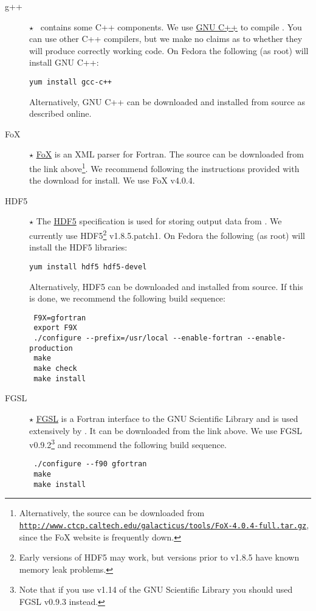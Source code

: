 \begin{description}
 \item [g++] $\star$ \glc\ contains some C++ components. We use \href{http://gcc.gnu.org/projects/cxx0x.html}{GNU C++} to compile \glc. You can use other C++ compilers, but we make no claims as to whether they will produce correctly working code. On Fedora the following (as root) will install GNU C++:
\begin{verbatim}
yum install gcc-c++
\end{verbatim}
Alternatively, GNU C++ can be downloaded and installed from source as described online.

 \item [FoX] $\star$ \href{http://uszla.me.uk/space/software/FoX/}{FoX} is an XML parser for Fortran. The source can be downloaded from the link above\footnote{Alternatively, the source can be downloaded from \href{http://www.ctcp.caltech.edu/galacticus/tools/FoX-4.0.4-full.tar.gz}{\tt http://www.ctcp.caltech.edu/galacticus/tools/FoX-4.0.4-full.tar.gz}, since the FoX website is frequently down.}. We recommend following the instructions provided with the download for install. We use FoX v4.0.4.

 \item [HDF5] $\star$ The \href{http://hdf4.org/HDF5/}{HDF5} specification is used for storing output data from \glc. We currently use HDF5\footnote{Early versions of HDF5 may work, but versions prior to v1.8.5 have known memory leak problems.} v1.8.5.patch1. On Fedora the following (as root) will install the HDF5 libraries:
\begin{verbatim}
yum install hdf5 hdf5-devel
\end{verbatim}
Alternatively, HDF5 can be downloaded and installed from source. If this is done, we recommend the following build sequence:
\begin{verbatim}
 F9X=gfortran
 export F9X
 ./configure --prefix=/usr/local --enable-fortran --enable-production
 make
 make check
 make install
\end{verbatim}

 \item [FGSL] $\star$ \href{http://www.lrz-muenchen.de/services/software/mathematik/gsl/fortran/}{FGSL} is a Fortran interface to the GNU Scientific Library and is used extensively by \glc. It can be downloaded from the link above. We use FGSL v0.9.2\footnote{Note that if you use v1.14 of the GNU Scientific Library you should used FGSL v0.9.3 instead.} and recommend the following build sequence. 
\begin{verbatim}
 ./configure --f90 gfortran
 make
 make install
\end{verbatim}

\end{description}

